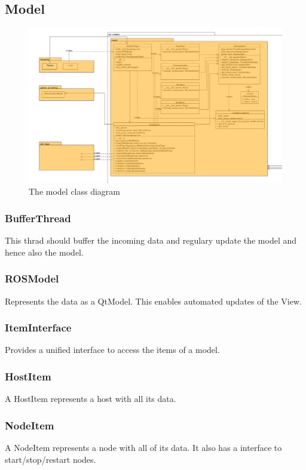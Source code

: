 \subsection{Model}

\begin{figure}[here]
\begin{center}
\includegraphics[width=1.0\linewidth]{./bilder/model.png}
\caption{The model class diagram}
\end{center}
\end{figure}

\subsubsection{BufferThread}
This thrad should buffer the incoming data and regulary update the model and hence also the model.
\subsubsection{ROSModel}
Represents the data as a QtModel. This enables automated updates of the View.
\subsubsection{ItemInterface}
Provides a unified interface to access the items of a model.
\subsubsection{HostItem}
A HostItem represents a host with all its data.
\subsubsection{NodeItem}
 A NodeItem represents a node with all of its data. It also has a interface to start/stop/restart nodes.

